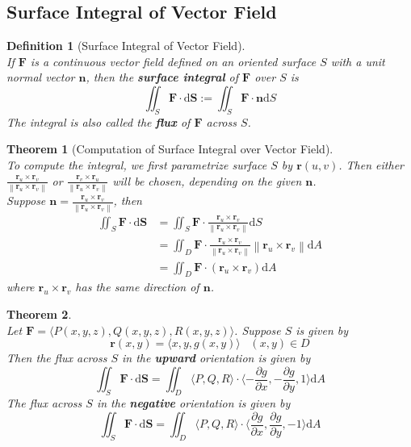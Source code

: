 \documentclass[12pt]{article}
\newcommand\norm[1]{\left\lVert#1\right\rVert}
\newtheorem{definition}{Definition}[section]
\newtheorem{theorem}{Theorem}[section]
\theoremstyle{definition}
\newcommand{\diff}{\mathrm{d}}
\begin{document}
\subsection{Surface Integral of Vector Field}
\begin{definition}[Surface Integral of Vector Field]
\hfill\\\normalfont If $\mathbf{F}$ is a continuous vector field defined on an oriented surface $S$ with a unit normal vector $\mathbf{n}$, then the \textbf{surface integral} of $\mathbf{F}$ over $S$ is
\[
\iint_S\mathbf{F}\cdot\diff\mathbf{S}:=\iint_S\mathbf{F}\cdot\mathbf{n}\diff S
\]
The integral is also called the \textbf{flux} of $\mathbf{F}$ across $S$.
\end{definition}
\begin{theorem}[Computation of Surface Integral over Vector Field]\hfill\\\normalfont
To compute the integral, we first parametrize surface $S$ by $\mathbf{r}(u,v)$. Then either $\frac{\mathbf{r}_u\times \mathbf{r}_v}{\norm{\mathbf{r}_u\times \mathbf{r}_v}}$ or $\frac{\mathbf{r}_v\times\mathbf{r}_u}{\norm{\mathbf{r}_u\times \mathbf{r}_v}}$ will be chosen, depending on the given $\mathbf{n}$. \\Suppose $\mathbf{n}=\frac{\mathbf{r}_u\times \mathbf{r}_v}{\norm{\mathbf{r}_u\times \mathbf{r}_v}}$, then
\begin{align*}
\iint_S\mathbf{F}\cdot\diff \mathbf{S}&=\iint_S\mathbf{F}\cdot\frac{\mathbf{r}_u\times \mathbf{r}_v}{\norm{\mathbf{r}_u\times \mathbf{r}_v}}\diff S\\
&=\iint_D \mathbf{F}\cdot \frac{\mathbf{r}_u\times \mathbf{r}_v}{\norm{\mathbf{r}_u\times \mathbf{r}_v}}\norm{\mathbf{r}_u\times \mathbf{r}_v}\diff A\\
&=\iint_D\mathbf{F}\cdot(\mathbf{r}_u\times\mathbf{r}_v)\diff A
\end{align*}
where $\mathbf{r}_u\times\mathbf{r}_v$ has the same direction of $\mathbf{n}$.
\end{theorem}
\begin{theorem}\hfill\\\normalfont
Let $\mathbf{F}=\langle P(x,y,z),Q(x,y,z),R(x,y,z) \rangle$. Suppose $S$ is given by
\[
\mathbf{r}(x,y)=\langle x,y,g(x,y)\rangle\;\;\;(x,y)\in D
\]
Then the flux across $S$ in the \textbf{upward} orientation is given by
\[
\iint_S\mathbf{F}\cdot\diff\mathbf{S}=\iint_D\langle P,Q,R\rangle \cdot\langle-\frac{\partial g}{\partial x},-\frac{\partial g}{\partial y}, 1 \rangle\diff A
\]
The flux across $S$ in the \textbf{negative} orientation is given by
\[
\iint_S\mathbf{F}\cdot\diff\mathbf{S}=\iint_D\langle P,Q,R\rangle \cdot\langle\frac{\partial g}{\partial x},\frac{\partial g}{\partial y}, -1 \rangle\diff A
\]
\end{theorem}
\clearpage
\end{document}
